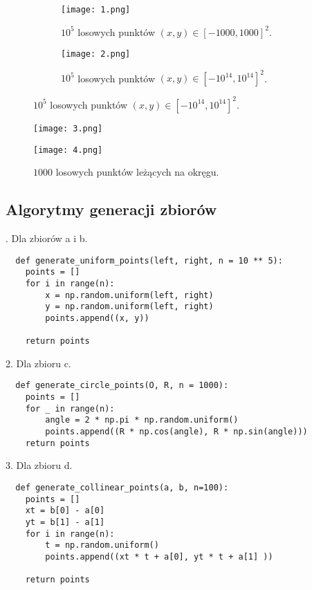 \begin{figure}[h]
    \centering
    \begin{subfigure}{.5\textwidth}
      \centering
      \texttt{[image: 1.png]}
      \caption{$10^5$ losowych punktów $(x, y) \in \left[-1000,1000\right]^{2}$.}
      \label{fig:sub1}
    \end{subfigure}%
    \begin{subfigure}{.5\textwidth}
      \centering
      \texttt{[image: 2.png]}
      \caption{$10^5$ losowych punktów $(x, y) \in \left[-10^{14},10^{14}\right]^{2}$.}
      \label{fig:sub2}
    \end{subfigure}
    \label{fig:test}
    \end{figure}
    
    \begin{figure}[h]
    \centering
    \begin{minipage}{.5\textwidth}
      \centering
      \texttt{[image: 3.png]}
      \caption{$1000$ losowych punktów leżących na okręgu.}
      \label{fig:test1}
    \end{minipage}%
    \begin{minipage}{.5\textwidth}
      \centering
      \texttt{[image: 4.png]}
      \label{fig:test2}
    \end{minipage}
    \end{figure}

    \subsection{Algorytmy generacji zbiorów}
. Dla zbiorów a i b.
 \begin{lstlisting}
  def generate_uniform_points(left, right, n = 10 ** 5):
    points = []
    for i in range(n):
        x = np.random.uniform(left, right)
        y = np.random.uniform(left, right)
        points.append((x, y))

    return points
\end{lstlisting}
\par
2. Dla zbioru c.
\begin{lstlisting}
  def generate_circle_points(O, R, n = 1000):
    points = []
    for _ in range(n):
        angle = 2 * np.pi * np.random.uniform()
        points.append((R * np.cos(angle), R * np.sin(angle)))
    return points
\end{lstlisting}
\par
3. Dla zbioru d.
\begin{lstlisting}
  def generate_collinear_points(a, b, n=100):
    points = []
    xt = b[0] - a[0]
    yt = b[1] - a[1]
    for i in range(n):
        t = np.random.uniform()
        points.append((xt * t + a[0], yt * t + a[1] ))
    
    return points
\end{lstlisting}
\newpage